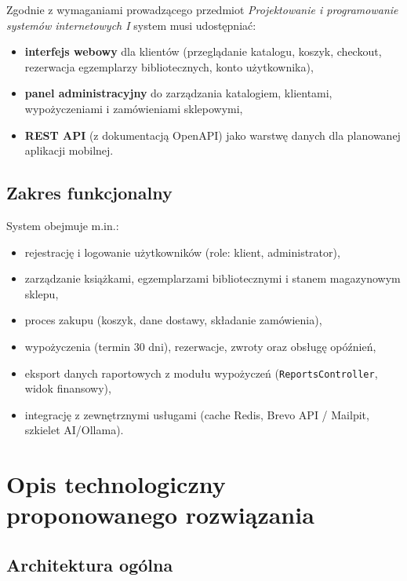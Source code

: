 \documentclass[12pt,a4paper]{article}
\begin{document}
Zgodnie z wymaganiami prowadzącego przedmiot \emph{Projektowanie i programowanie systemów internetowych I}
system musi udostępniać:
\begin{itemize}
    \item \textbf{interfejs webowy} dla klientów (przeglądanie katalogu, koszyk, checkout,
          rezerwacja egzemplarzy bibliotecznych, konto użytkownika),
    \item \textbf{panel administracyjny} do zarządzania katalogiem, klientami,
          wypożyczeniami i zamówieniami sklepowymi,
    \item \textbf{REST API} (z dokumentacją OpenAPI) jako warstwę danych dla
          planowanej aplikacji mobilnej.
\end{itemize}

\subsection{Zakres funkcjonalny}

System obejmuje m.in.:
\begin{itemize}
    \item rejestrację i logowanie użytkowników (role: klient, administrator),
    \item zarządzanie książkami, egzemplarzami bibliotecznymi i stanem magazynowym sklepu,
    \item proces zakupu (koszyk, dane dostawy, składanie zamówienia),
    \item wypożyczenia (termin 30 dni), rezerwacje, zwroty oraz obsługę opóźnień,
    \item eksport danych raportowych z modułu wypożyczeń (\texttt{ReportsController}, widok finansowy),
    \item integrację z zewnętrznymi usługami (cache Redis, Brevo API / Mailpit, szkielet AI/Ollama).
\end{itemize}

\section{Opis technologiczny proponowanego rozwiązania}

\subsection{Architektura ogólna}
\end{document}
